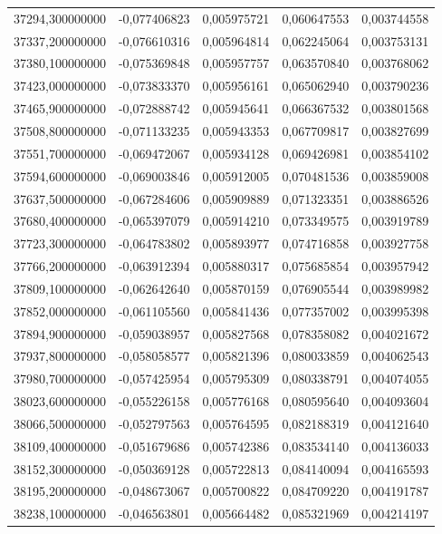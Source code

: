 \begin{longtable}{rrrrr}
37294,300000000 & -0,077406823 & 0,005975721 & 0,060647553 & 0,003744558\\
37337,200000000 & -0,076610316 & 0,005964814 & 0,062245064 & 0,003753131\\
37380,100000000 & -0,075369848 & 0,005957757 & 0,063570840 & 0,003768062\\
37423,000000000 & -0,073833370 & 0,005956161 & 0,065062940 & 0,003790236\\
37465,900000000 & -0,072888742 & 0,005945641 & 0,066367532 & 0,003801568\\
37508,800000000 & -0,071133235 & 0,005943353 & 0,067709817 & 0,003827699\\
37551,700000000 & -0,069472067 & 0,005934128 & 0,069426981 & 0,003854102\\
37594,600000000 & -0,069003846 & 0,005912005 & 0,070481536 & 0,003859008\\
37637,500000000 & -0,067284606 & 0,005909889 & 0,071323351 & 0,003886526\\
37680,400000000 & -0,065397079 & 0,005914210 & 0,073349575 & 0,003919789\\
37723,300000000 & -0,064783802 & 0,005893977 & 0,074716858 & 0,003927758\\
37766,200000000 & -0,063912394 & 0,005880317 & 0,075685854 & 0,003957942\\
37809,100000000 & -0,062642640 & 0,005870159 & 0,076905544 & 0,003989982\\
37852,000000000 & -0,061105560 & 0,005841436 & 0,077357002 & 0,003995398\\
37894,900000000 & -0,059038957 & 0,005827568 & 0,078358082 & 0,004021672\\
37937,800000000 & -0,058058577 & 0,005821396 & 0,080033859 & 0,004062543\\
37980,700000000 & -0,057425954 & 0,005795309 & 0,080338791 & 0,004074055\\
38023,600000000 & -0,055226158 & 0,005776168 & 0,080595640 & 0,004093604\\
38066,500000000 & -0,052797563 & 0,005764595 & 0,082188319 & 0,004121640\\
38109,400000000 & -0,051679686 & 0,005742386 & 0,083534140 & 0,004136033\\
38152,300000000 & -0,050369128 & 0,005722813 & 0,084140094 & 0,004165593\\
38195,200000000 & -0,048673067 & 0,005700822 & 0,084709220 & 0,004191787\\
38238,100000000 & -0,046563801 & 0,005664482 & 0,085321969 & 0,004214197\\

\end{longtable}
